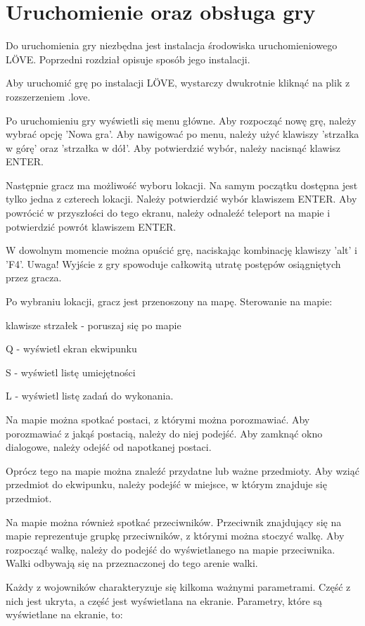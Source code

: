 \chapter{Uruchomienie oraz obsługa gry}
Do uruchomienia gry niezbędna jest instalacja środowiska uruchomieniowego LÖVE.
Poprzedni rozdział opisuje sposób jego instalacji.

Aby uruchomić grę po instalacji LÖVE, wystarczy dwukrotnie kliknąć na plik 
z rozszerzeniem .love.

Po uruchomieniu gry wyświetli się menu główne. Aby rozpocząć nowę grę, należy 
wybrać opcję 'Nowa gra'. Aby nawigować po menu, należy użyć klawiszy 'strzałka 
w górę' oraz 'strzałka w dół'. Aby potwierdzić wybór, należy nacisnąć klawisz 
ENTER.

Następnie gracz ma możliwość wyboru lokacji. Na samym początku dostępna jest 
tylko jedna z czterech lokacji. Należy potwierdzić wybór klawiszem ENTER.
Aby powrócić w przyszłości do tego ekranu, należy odnaleźć teleport na mapie i
potwierdzić powrót klawiszem ENTER.

W dowolnym momencie można opuścić grę, naciskając kombinację klawiszy 'alt' i 
'F4'. Uwaga! Wyjście z gry spowoduje całkowitą utratę postępów osiągniętych 
przez gracza.

Po wybraniu lokacji, gracz jest przenoszony na mapę. Sterowanie na mapie:

klawisze strzałek - poruszaj się po mapie

Q - wyświetl ekran ekwipunku

S - wyświetl listę umiejętności

L - wyświetl listę zadań do wykonania.

Na mapie można spotkać postaci, z którymi można porozmawiać.
Aby porozmawiać z jakąś postacią, należy do niej podejść.
Aby zamknąć okno dialogowe, należy odejść od napotkanej postaci.

Oprócz tego na mapie można znaleźć przydatne lub ważne przedmioty.
Aby wziąć przedmiot do ekwipunku, należy podejść w miejsce, w którym znajduje
się przedmiot.

Na mapie można również spotkać przeciwników.
Przeciwnik znajdujący się na mapie reprezentuje grupkę przeciwników, z którymi 
można stoczyć walkę.
Aby rozpocząć walkę, należy do podejść do wyświetlanego na mapie przeciwnika.
Walki odbywają się na przeznaczonej do tego arenie walki.

Każdy z wojowników charakteryzuje się kilkoma ważnymi parametrami.
Część z nich jest ukryta, a część jest wyświetlana na ekranie.
Parametry, które są wyświetlane na ekranie, to:

